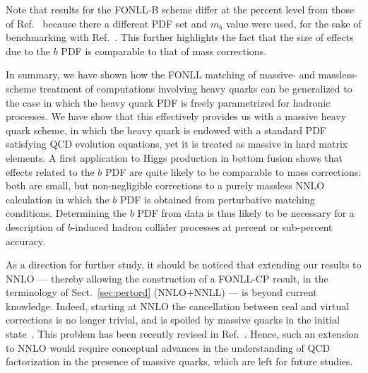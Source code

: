 Note that results for the FONLL-B
scheme differ at the percent level from those of 
Ref.~\cite{Forte:2016sja} because there a different PDF set and $m_b$
value were used,
for the sake of benchmarking with
Ref.~\cite{Bonvini:2015pxa,Bonvini:2016fgf}. This further highlights
the fact that the size of effects due to the $b$ PDF is comparable to
that of mass corrections.

In summary, we have shown how the FONLL matching of massive- and
massless-scheme treatment of computations involving heavy quarks can
be generalized to the case in which the heavy quark PDF is freely
parametrized for hadronic processes. We have show that this
effectively provides us with a massive heavy quark scheme, in which
the heavy quark is endowed with a standard PDF satisfying QCD
evolution equations, yet it is treated as massive in hard matrix
elements. A first application to Higgs production in bottom fusion
shows that effects related to the $b$ PDF are quite likely to be
comparable to mass corrections: both are small, but non-negligible
corrections to a purely massless NNLO calculation in which the $b$ PDF
is obtained from perturbative matching conditions. Determining the $b$
PDF from data is thus likely to be necessary for a description of
$b$-induced hadron collider processes at percent or sub-percent accuracy.

As a direction for further study, it should be noticed that extending
our results to NNLO --- thereby allowing the construction of a
FONLL-CP result, in the terminology of Sect.~\ref{sec:pertord}
(NNLO+NNLL) --- is beyond current knowledge. Indeed, starting at NNLO
the cancellation between real and virtual
corrections is no longer trivial, and is spoiled by
massive quarks in the initial
state~\cite{Doria:1980ak,Catani:1985xt}. 
This problem has been recently revised in Ref.~\cite{Caola:2020xup}.
Hence, such an extension to NNLO
would require conceptual advances in the understanding of QCD
factorization in the presence of massive quarks, which are left for
future studies.

